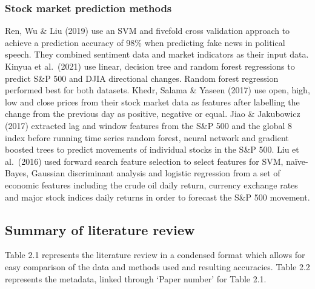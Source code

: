 \documentclass[11pt,preprint, authoryear]{elsarticle}
\numberwithin{equation}{section}
\numberwithin{figure}{section}
\numberwithin{table}{section}
\begin{document}
\hypertarget{stock-market-prediction-methods}{%
\subsubsection{Stock market prediction
methods}\label{stock-market-prediction-methods}}

Ren, Wu \& Liu (2019) use an SVM and fivefold cross validation approach
to achieve a prediction accuracy of 98\% when predicting fake news in
political speech. They combined sentiment data and market indicators as
their input data. Kinyua et al.~(2021) use linear, decision tree and
random forest regressions to predict S\&P 500 and DJIA directional
changes. Random forest regression performed best for both datasets.
Khedr, Salama \& Yaseen (2017) use open, high, low and close prices from
their stock market data as features after labelling the change from the
previous day as positive, negative or equal. Jiao \& Jakubowicz (2017)
extracted lag and window features from the S\&P 500 and the global 8
index before running time series random forest, neural network and
gradient boosted trees to predict movements of individual stocks in the
S\&P 500. Liu et al.~(2016) used forward search feature selection to
select features for SVM, naïve-Bayes, Gaussian discriminant analysis and
logistic regression from a set of economic features including the crude
oil daily return, currency exchange rates and major stock indices daily
returns in order to forecast the S\&P 500 movement.

\hypertarget{summary-of-literature-review}{%
\subsection{Summary of literature
review}\label{summary-of-literature-review}}

Table 2.1 represents the literature review in a condensed format which
allows for easy comparison of the data and methods used and resulting
accuracies. Table 2.2 represents the metadata, linked through `Paper
number' for Table 2.1.
\end{document}

